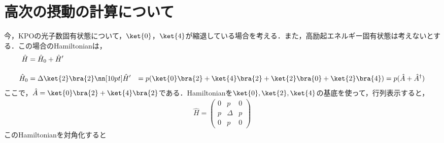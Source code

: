 \section{高次の摂動の計算について}
今，KPOの光子数固有状態について，$\ket{0}$，$\ket{4}$が縮退している場合を考える．また，高励起エネルギー固有状態は考えないとする．この場合のHamiltonianは，
\begin{align}
    \hat{H} &= \hat{H}_0 + \hat{H}^{\prime}\\[10pt]
    \hat{H}_0 &= \Delta \ket{2}\bra{2}\nn[10pt]
    \hat{H}^{\prime} &
    = p(\ket{0}\bra{2} + \ket{4}\bra{2} + \ket{2}\bra{0} + \ket{2}\bra{4})
    = p(\hat{A} + \hat{A}^{\dagger})
\end{align}
ここで，$\hat{A} = \ket{0}\bra{2} + \ket{4}\bra{2}$である．Hamiltonianを$\ket{0}, \ket{2}, \ket{4}$の基底を使って，行列表示すると，
\begin{align}
    \hat{H}=
    \left(
    \begin{array}{ccc}
    0 & p & 0 \\[5pt]
    p & \Delta & p \\[5pt]
    0 & p & 0
    \end{array}
    \right)
\end{align}
このHamiltonianを対角化すると



